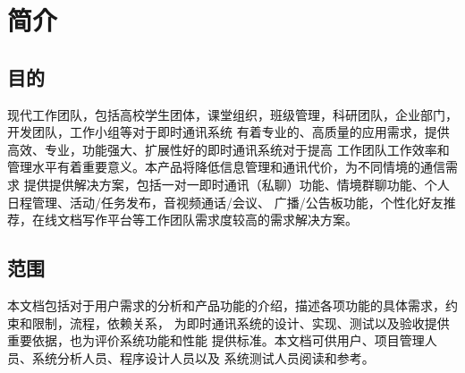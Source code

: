 \chapter{简介}
\section{目的}


现代工作团队，包括高校学生团体，课堂组织，班级管理，科研团队，企业部门，开发团队，工作小组等对于即时通讯系统
有着专业的、高质量的应用需求，提供高效、专业，功能强大、扩展性好的即时通讯系统对于提高
工作团队工作效率和管理水平有着重要意义。本产品将降低信息管理和通讯代价，为不同情境的通信需求
提供提供解决方案，包括一对一即时通讯（私聊）功能、情境群聊功能、个人日程管理、活动/任务发布，音视频通话/会议、
广播/公告板功能，个性化好友推荐，在线文档写作平台等工作团队需求度较高的需求解决方案。

\section{范围}

    本文档包括对于用户需求的分析和产品功能的介绍，描述各项功能的具体需求，约束和限制，流程，依赖关系，
    为即时通讯系统的设计、实现、测试以及验收提供重要依据，也为评价系统功能和性能
    提供标准。本文档可供用户、项目管理人员、系统分析人员、程序设计人员以及
    系统测试人员阅读和参考。
